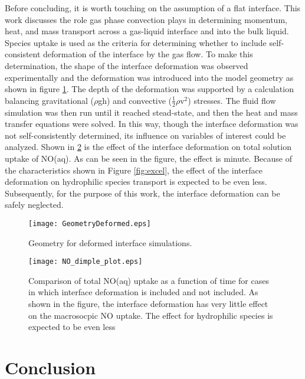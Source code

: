 \documentclass[12pt]{article}
\begin{document}
Before concluding, it is worth touching on the assumption of a flat interface. This work discusses the role gas phase convection plays in determining momentum, heat, and mass transport across a gas-liquid interface and into the bulk liquid. Species uptake is used as the criteria for determining whether to include self-consistent deformation of the interface by the gas flow. To make this determination, the shape of the interface deformation was observed experimentally and the deformation was introduced into the model geometry as shown in figure \ref{fig:deformed_geom}. The depth of the deformation was supported by a calculation balancing gravitational ($\rho$gh) and convective ($\frac{1}{2}\rho$v$^2$) stresses. The fluid flow simulation was then run until it reached stead-state, and then the heat and mass transfer equations were solved. In this way, though the interface deformation was not self-consistently determined, its influence on variables of interest could be analyzed. Shown in \ref{fig:NO_deform_compare} is the effect of the interface deformation on total solution uptake of NO(aq). As can be seen in the figure, the effect is minute. Because of the characteristics shown in Figure \ref{fig:excel}, the effect of the interface deformation on hydrophilic species transport is expected to be even less. Subsequently, for the purpose of this work, the interface deformation can be safely neglected.  

\begin{figure}[htb]
    \centering
    \texttt{[image: GeometryDeformed.eps]}
    \caption{Geometry for deformed interface simulations.}
    \label{fig:deformed_geom}
\end{figure}

\begin{figure}[htb]
    \centering
    \texttt{[image: NO\_dimple\_plot.eps]}
    \caption{Comparison of total NO(aq) uptake as a function of time for cases in which interface deformation is included and not included. As shown in the figure, the interface deformation has very little effect on the macrosocpic NO uptake. The effect for hydrophilic species is expected to be even less}
    \label{fig:NO_deform_compare}
\end{figure}

\section{Conclusion}
\end{document}
